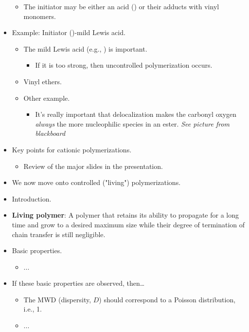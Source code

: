 \documentclass[../notes.tex]{subfiles}
\begin{document}
\begin{itemize}
\begin{itemize}
\begin{enumerate}
        \end{enumerate}
        \item The initiator may be either an acid () or their adducts with vinyl monomers.
    \end{itemize}
    \item Example: Initiator ()-mild Lewis acid.
    \begin{itemize}
        \item The mild Lewis acid (e.g., ) is important.
        \begin{itemize}
            \item If it is too strong, then uncontrolled polymerization occurs.
        \end{itemize}
        \item Vinyl ethers.
        \item Other example.
        \begin{itemize}
            \item It's really important that delocalization makes the carbonyl oxygen \emph{always} the more nucleophilic species in an ester.
            \emph{See picture from blackboard}
        \end{itemize}
    \end{itemize}
    \item Key points for cationic polymerizations.
    \begin{itemize}
        \item Review of the major slides in the presentation.
    \end{itemize}
    \item We now move onto controlled ("living") polymerizations.
    \item Introduction.
    \item \textbf{Living polymer}: A polymer that retains its ability to propagate for a long time and grow to a desired maximum size while their degree of termination of chain transfer is still negligible.
    \item Basic properties.
    \begin{itemize}
        \item ...
    \end{itemize}
    \item If these basic properties are observed, then\dots
    \begin{itemize}
        \item The MWD (dispersity, $D$) should correspond to a Poisson distribution, i.e., 1.
        \item ...

\end{itemize}
\end{itemize}
\end{document}
